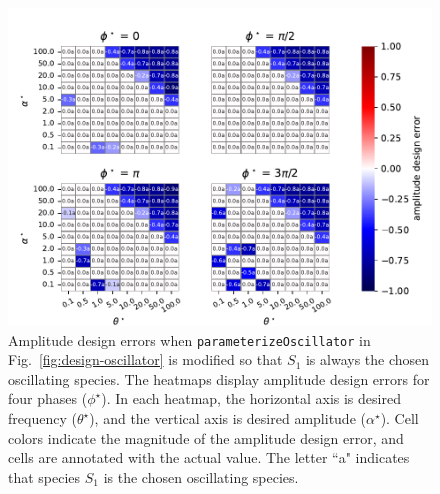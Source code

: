 \documentclass{bmcart}
\newcommand{\fig}[1]{Fig.~\ref{#1}}
\begin{document}
\begin{backmatter}
\begin{figure}
        \centering
\includegraphics[scale=0.75]{figures/Figure_4.pdf}
         \caption[]{Amplitude design errors when {\tt parameterizeOscillator} in \fig{fig:design-oscillator} is modified so that $S_1$ is always the chosen oscillating species. The heatmaps display amplitude design errors for four phases ($\phi^{\star}$). In each heatmap, the horizontal axis is desired frequency ($\theta^{\star}$), and the vertical axis is desired amplitude ($\alpha^{\star}$). Cell colors indicate the magnitude of the amplitude design error, and cells are annotated with the actual value. The letter ``a" indicates that species $S_1$ is the chosen oscillating species.} 
         \label{fig:amplitude-design-error-x1}
\end{figure}



\end{backmatter}
\end{document}

